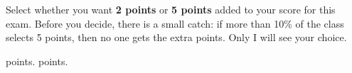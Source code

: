 \bonusquestion
Select whether you want \textbf{2 points} or \textbf{5 points} added to your score for this exam. Before you decide, there is a small catch: if more than 10\% of the class selects 5 points, then no one gets the extra points. Only I will see your choice.

\begin{oneparchoices}
	 points.
	 points.
\end{oneparchoices}
	